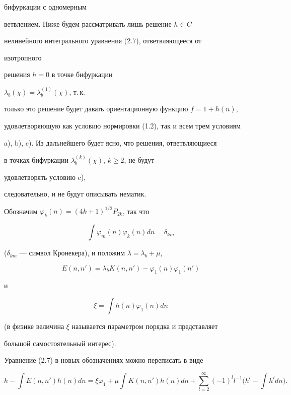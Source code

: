 бифуркации с одномерным 


ветвлением. Ниже будем рассматривать лишь решение $h\in C$ 


нелинейного интегрального уравнения (2.7), ответвляющееся от 


изотропного 


решения $h=0$ в точке бифуркации 


$\lambda_b(\chi)=\lambda^{(1)}_b(\chi)$, т.\,к. 


только это решение будет давать ориентационную функцию $f=1+h(n)$, 


удовлетворяющую как условию нормировки (1.2), так и всем трем условиям 


a), b), c). Из дальнейшего будет ясно, что решения, ответвляющиеся 


в точках бифуркации $\lambda^{(k)}_b(\chi)$, $k\ge 2$, не будут 


удовлетворять условию c), 


следовательно, и не будут описывать нематик.  


 


Обозначим $\varphi_k(n)=(4k+1)^{1/2}P_{2k}$, так что  


$$ 


\int\varphi_m(n)\varphi_k(n)dn=\delta_{km} 


$$ 


($\delta_{km}$ --- символ Кронекера), и положим $\lambda=\lambda_b+\mu$, 


$$ 


E(n,n')=\lambda_b K(n,n')-\varphi_1(n)\varphi_1(n') 


$$ 


и 


\begin{equation} 


\xi=\int h(n)\varphi_1(n)dn\tag{2.17} 


\end{equation} 


(в физике величина $\xi$ называется параметром порядка и представляет  


большой самостоятельный интерес).


 


Уравнение (2.7) в новых обозначениях можно переписать в виде 


\begin{equation} 


h-\int E(n,n')h(n)dn=\xi\varphi_1+\mu\int K(n,n') 


h(n)dn+\sum^\infty_{l=2}(-1)^l l^{-1} 


\Big(h^l-\int h^l dn\Big).\tag{2.18} 


\end{equation} 


